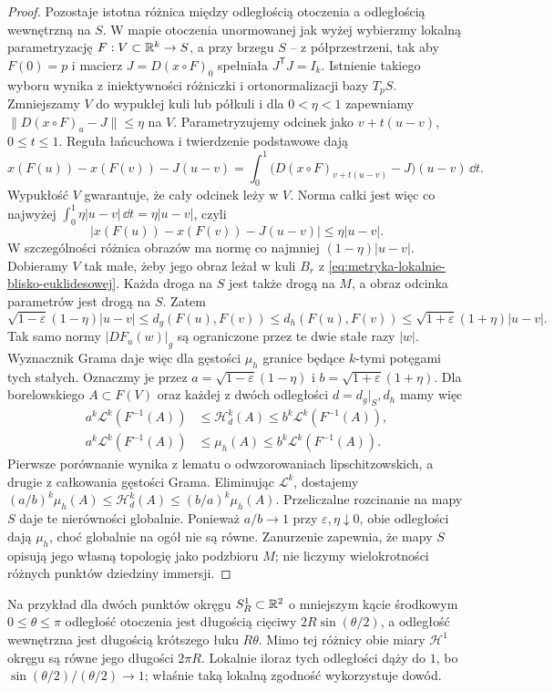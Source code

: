 \begin{proof}
Pozostaje istotna różnica między odległością otoczenia
a odległością wewnętrzną na $S$. W mapie otoczenia
unormowanej jak wyżej wybierzmy lokalną parametryzację
$F:V\subset\mathbb{R}^k\to S$, a przy brzegu $S$ -- z półprzestrzeni,
tak aby $F(0)=p$ i macierz $J=D(x\circ F)_0$ spełniała
$J^{\mathsf T}J=I_k$. Istnienie takiego wyboru wynika
z iniektywności różniczki i ortonormalizacji bazy $T_pS$.
Zmniejszamy $V$ do wypukłej kuli lub półkuli i dla
$0<\eta<1$ zapewniamy
$\|D(x\circ F)_u-J\|\leq\eta$ na $V$.
Parametryzujemy odcinek jako $v+t(u-v)$, $0\leq t\leq1$.
Reguła łańcuchowa i twierdzenie podstawowe dają
\[
 x(F(u))-x(F(v))-J(u-v)
 =\int_0^1
 \bigl(D(x\circ F)_{v+t(u-v)}-J\bigr)(u-v)\,\dd t.
\]
Wypukłość $V$ gwarantuje, że cały odcinek leży w $V$.
Norma całki jest więc co najwyżej
$\int_0^1\eta|u-v|\,\dd t=\eta|u-v|$, czyli
\[
 |x(F(u))-x(F(v))-J(u-v)|\leq\eta|u-v|.
\]
W szczególności różnica obrazów ma normę co najmniej
$(1-\eta)|u-v|$. Dobieramy $V$ tak małe, żeby jego
obraz leżał w kuli $B_r$ z
\eqref{eq:metryka-lokalnie-blisko-euklidesowej}.
Każda droga na $S$ jest także drogą na $M$, a obraz
odcinka parametrów jest drogą na $S$. Zatem
\[
 \sqrt{1-\varepsilon}(1-\eta)|u-v|
 \leq d_g(F(u),F(v))
 \leq d_h(F(u),F(v))
 \leq\sqrt{1+\varepsilon}(1+\eta)|u-v|.
\]
Tak samo normy $|D F_u(w)|_g$ są ograniczone przez
te dwie stałe razy $|w|$. Wyznacznik Grama daje więc
dla gęstości $\mu_h$ granice będące $k$-tymi potęgami
tych stałych. Oznaczmy je przez
$a=\sqrt{1-\varepsilon}(1-\eta)$
i $b=\sqrt{1+\varepsilon}(1+\eta)$.
Dla borelowskiego $A\subset F(V)$ oraz każdej
z dwóch odległości $d=d_g|_S,d_h$ mamy więc
\begin{align*}
 a^k\mathcal L^k(F^{-1}(A))
 &\leq\mathcal H^k_d(A)
 \leq b^k\mathcal L^k(F^{-1}(A)),\\
 a^k\mathcal L^k(F^{-1}(A))
 &\leq\mu_h(A)
 \leq b^k\mathcal L^k(F^{-1}(A)).
\end{align*}
Pierwsze porównanie wynika z lematu o odwzorowaniach
lipschitzowskich, a drugie z całkowania gęstości Grama.
Eliminując $\mathcal L^k$, dostajemy
$(a/b)^k\mu_h(A)\leq\mathcal H^k_d(A)\leq(b/a)^k\mu_h(A)$.
Przeliczalne rozcinanie na mapy $S$ daje te nierówności
globalnie. Ponieważ $a/b\to1$ przy
$\varepsilon,\eta\downarrow0$, obie odległości dają
$\mu_h$, choć globalnie na ogół nie są równe.
Zanurzenie zapewnia, że mapy $S$ opisują jego własną
topologię jako podzbioru $M$; nie liczymy wielokrotności
różnych punktów dziedziny immersji.
\end{proof}

Na przykład dla dwóch punktów okręgu $S_R^1\subset\mathbb{R}^2$
o mniejszym kącie środkowym $0\leq\theta\leq\pi$
odległość otoczenia jest długością cięciwy
$2R\sin(\theta/2)$, a odległość wewnętrzna jest
długością krótszego łuku $R\theta$.
Mimo tej różnicy obie miary $\mathcal H^1$ okręgu
są równe jego długości $2\pi R$.
Lokalnie iloraz tych odległości dąży do $1$,
bo $\sin(\theta/2)/(\theta/2)\to1$;
właśnie taką lokalną zgodność wykorzystuje dowód.

